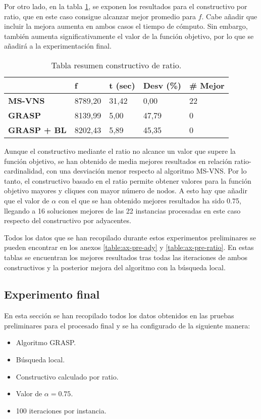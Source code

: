 Por otro lado, en la tabla \ref{tab:pre-ratio}, se exponen los resultados para el constructivo por ratio, que en este caso consigue alcanzar mejor promedio para $f$. Cabe añadir que incluir la mejora aumenta en ambos casos el tiempo de cómputo. Sin embargo, también aumenta significativamente el valor de la función objetivo, por lo que se añadirá a la experimentación final.\\

\begin{table}[H]
	\centering
	\begin{tabular}{lllll}
		\hline
		& \textbf{f} & \textbf{t (sec)} & \textbf{Desv (\%)} & \textbf{\# Mejor} \\ \hline
		\textbf{MS-VNS}     & 8789,20    & 31,42            & 0,00             & 22                \\
		\textbf{GRASP}      & 8139,99    & 5,00             & 47,79            & 0                 \\
		\textbf{GRASP + BL} & 8202,43    & 5,89             & 45,35            & 0                 \\ \hline
	\end{tabular}
	\caption{Tabla resumen constructivo de ratio.}
	\label{tab:pre-ratio}
\end{table}

Aunque el constructivo mediante el ratio no alcance un valor que supere la función objetivo, se han obtenido de media mejores resultados en relación ratio-cardinalidad, con una desviación menor respecto al algoritmo MS-VNS. Por lo tanto, el constructivo basado en el ratio permite obtener valores para la función objetivo mayores y cliques con mayor número de nodos. A esto hay que añadir que el valor de $\alpha$ con el que se han obtenido mejores resultados ha sido 0.75, llegando a 16 soluciones mejores de las 22 instancias procesadas en este caso respecto del constructivo por adyacentes.

Todos los datos que se han recopilado durante estos experimentos preliminares se pueden encontrar en los anexos \ref{table:ax-pre-ady} y \ref{table:ax-pre-ratio}. En estas tablas se encuentran los mejores resultados tras todas las iteraciones de ambos constructivos y la posterior mejora del algoritmo con la búsqueda local.

\subsection{Experimento final}

En esta sección se han recopilado todos los datos obtenidos en las pruebas preliminares para el procesado final y se ha configurado de la siguiente manera:
\begin{itemize}
	\item Algoritmo \gls{GRASP}.
	\item Búsqueda local.
	\item Constructivo calculado por ratio.
	\item Valor de $\alpha = 0.75$. 
	\item 100 iteraciones por instancia.
\end{itemize}

